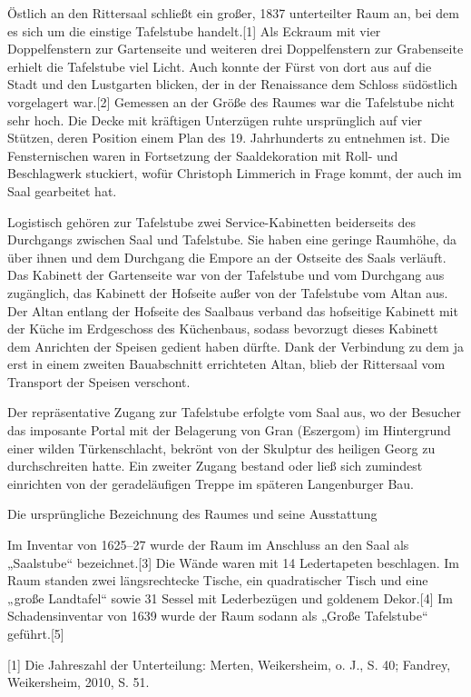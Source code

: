 \documentclass[
  a4paper,
  portrait]{book}
\begin{document}
Östlich an den Rittersaal schließt ein großer, 1837 unterteilter Raum
an, bei dem es sich um die einstige Tafelstube handelt.{[}1{]} Als
Eckraum mit vier Doppelfenstern zur Gartenseite und weiteren drei
Doppelfenstern zur Grabenseite erhielt die Tafelstube viel Licht. Auch
konnte der Fürst von dort aus auf die Stadt und den Lustgarten blicken,
der in der Renaissance dem Schloss südöstlich vorgelagert war.{[}2{]}
Gemessen an der Größe des Raumes war die Tafelstube nicht sehr hoch. Die
Decke mit kräftigen Unterzügen ruhte ursprünglich auf vier Stützen,
deren Position einem Plan des 19. Jahrhunderts zu entnehmen ist. Die
Fensternischen waren in Fortsetzung der Saaldekoration mit Roll- und
Beschlagwerk stuckiert, wofür Christoph Limmerich in Frage kommt, der
auch im Saal gearbeitet hat.

Logistisch gehören zur Tafelstube zwei Service-Kabinetten beiderseits
des Durchgangs zwischen Saal und Tafelstube. Sie haben eine geringe
Raumhöhe, da über ihnen und dem Durchgang die Empore an der Ostseite des
Saals verläuft. Das Kabinett der Gartenseite war von der Tafelstube und
vom Durchgang aus zugänglich, das Kabinett der Hofseite außer von der
Tafelstube vom Altan aus. Der Altan entlang der Hofseite des Saalbaus
verband das hofseitige Kabinett mit der Küche im Erdgeschoss des
Küchenbaus, sodass bevorzugt dieses Kabinett dem Anrichten der Speisen
gedient haben dürfte. Dank der Verbindung zu dem ja erst in einem
zweiten Bauabschnitt errichteten Altan, blieb der Rittersaal vom
Transport der Speisen verschont.

Der repräsentative Zugang zur Tafelstube erfolgte vom Saal aus, wo der
Besucher das imposante Portal mit der Belagerung von Gran (Eszergom) im
Hintergrund einer wilden Türkenschlacht, bekrönt von der Skulptur des
heiligen Georg zu durchschreiten hatte. Ein zweiter Zugang bestand oder
ließ sich zumindest einrichten von der geradeläufigen Treppe im späteren
Langenburger Bau.

Die ursprüngliche Bezeichnung des Raumes und seine Ausstattung

Im Inventar von 1625--27 wurde der Raum im Anschluss an den Saal als
„Saalstube`` bezeichnet.{[}3{]} Die Wände waren mit 14 Ledertapeten
beschlagen. Im Raum standen zwei längsrechtecke Tische, ein
quadratischer Tisch und eine „große Landtafel`` sowie 31 Sessel mit
Lederbezügen und goldenem Dekor.{[}4{]} Im Schadensinventar von 1639
wurde der Raum sodann als „Große Tafelstube`` geführt.{[}5{]}

{[}1{]} Die Jahreszahl der Unterteilung: Merten, Weikersheim, o. J., S.
40; Fandrey, Weikersheim, 2010, S. 51.
\end{document}
